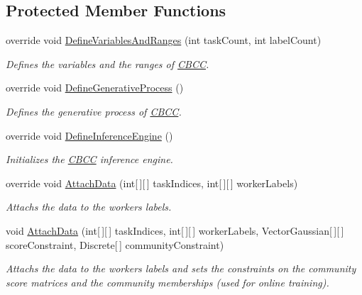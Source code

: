 \subsection*{Protected Member Functions}
\begin{DoxyCompactItemize}
\item 
override void \hyperlink{class_crowdsourcing_models_1_1_c_b_c_c_a33085b5a8b123a62a890eca1367a40ba}{Define\+Variables\+And\+Ranges} (int task\+Count, int label\+Count)
\begin{DoxyCompactList}\small\item\em Defines the variables and the ranges of \hyperlink{class_crowdsourcing_models_1_1_c_b_c_c}{C\+B\+C\+C}. \end{DoxyCompactList}\item 
override void \hyperlink{class_crowdsourcing_models_1_1_c_b_c_c_a11449d19d584834a5de6c877763d829e}{Define\+Generative\+Process} ()
\begin{DoxyCompactList}\small\item\em Defines the generative process of \hyperlink{class_crowdsourcing_models_1_1_c_b_c_c}{C\+B\+C\+C}. \end{DoxyCompactList}\item 
override void \hyperlink{class_crowdsourcing_models_1_1_c_b_c_c_a48270c4aca4a4d42f0a914772950ac9d}{Define\+Inference\+Engine} ()
\begin{DoxyCompactList}\small\item\em Initializes the \hyperlink{class_crowdsourcing_models_1_1_c_b_c_c}{C\+B\+C\+C} inference engine. \end{DoxyCompactList}\item 
override void \hyperlink{class_crowdsourcing_models_1_1_c_b_c_c_a768dbc90e6215dafc03e3bab5df4eb5c}{Attach\+Data} (int\mbox{[}$\,$\mbox{]}\mbox{[}$\,$\mbox{]} task\+Indices, int\mbox{[}$\,$\mbox{]}\mbox{[}$\,$\mbox{]} worker\+Labels)
\begin{DoxyCompactList}\small\item\em Attachs the data to the workers labels. \end{DoxyCompactList}\item 
void \hyperlink{class_crowdsourcing_models_1_1_c_b_c_c_a466df8df2843675faf22a20531a8e54d}{Attach\+Data} (int\mbox{[}$\,$\mbox{]}\mbox{[}$\,$\mbox{]} task\+Indices, int\mbox{[}$\,$\mbox{]}\mbox{[}$\,$\mbox{]} worker\+Labels, Vector\+Gaussian\mbox{[}$\,$\mbox{]}\mbox{[}$\,$\mbox{]} score\+Constraint, Discrete\mbox{[}$\,$\mbox{]} community\+Constraint)
\begin{DoxyCompactList}\small\item\em Attachs the data to the workers labels and sets the constraints on the community score matrices and the community memberships (used for online training). \end{DoxyCompactList}\item 

\end{DoxyCompactItemize}
